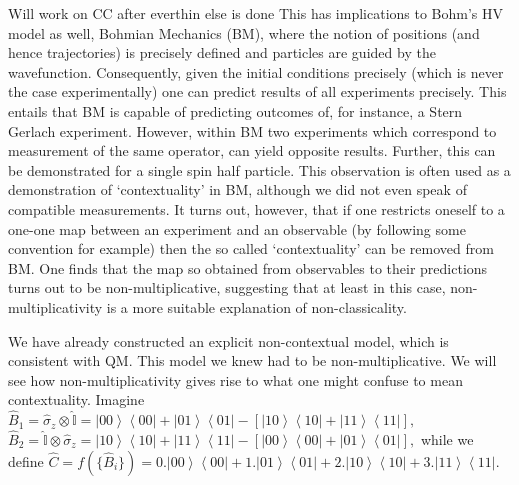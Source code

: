 \documentclass[british,aps,prl,superscriptaddress,nofootinbib,times,reprint]{revtex4-1}
\theoremstyle{plain}
\theoremstyle{definition}
\theoremstyle{remark}
\theoremstyle{remark}
\theoremstyle{remark}
\theoremstyle{plain}
\theoremstyle{plain}
\theoremstyle{plain}
\theoremstyle{definition}
\theoremstyle{definition}
\begin{document}
{\color{red} Will work on CC after everthin else
is done}
This has implications to Bohm's HV model as well, Bohmian Mechanics (BM), where the notion of positions (and hence trajectories) is precisely defined and particles are guided by the wavefunction. Consequently, given the initial conditions precisely (which is never the case experimentally) one can predict results of all experiments precisely. This entails that BM is capable of predicting outcomes of, for instance, a Stern Gerlach experiment. However, within BM two experiments which correspond to measurement of the same operator, can yield opposite results. Further, this can be demonstrated for a single spin half particle. This observation is often used as a demonstration of `contextuality' in BM, although we did not even speak of compatible measurements. It turns out, however, that if one restricts oneself to a one-one map between an experiment and an observable (by following some convention for example) then the so called `contextuality' can be removed from BM. One finds that the map so obtained from observables to their predictions turns out to be non-multiplicative, suggesting that at least in this case, non-multiplicativity is a more suitable explanation of non-classicality.

We have already constructed an explicit non-contextual model,
which is consistent with QM.  This model we knew
had to be non-multiplicative.  We will see how
non-multiplicativity gives rise to what one might
confuse to mean contextuality.  Imagine $\hat{B}_{1}=\hat{\sigma}_{z}\otimes\hat{\mathbb{I}}=\left|00\right\rangle
\left\langle 00\right|+\left|01\right\rangle
\left\langle 01\right|-\left[\left|10\right\rangle
\left\langle 10\right|+\left|11\right\rangle
\left\langle 11\right|\right],$ $
\hat{B}_{2}=\hat{\mathbb{I}}\otimes\hat{\sigma}_{z}=\left|10\right\rangle
\left\langle 10\right|+\left|11\right\rangle
\left\langle 11\right|-\left[\left|00\right\rangle
\left\langle 00\right|+\left|01\right\rangle
\left\langle 01\right|\right],$ while we define
$ \hat{C}=f(\{\hat{B}_{i}\})
=0.\left|00\right\rangle \left\langle
00\right|+1.\left|01\right\rangle \left\langle
01\right|+2.\left|10\right\rangle \left\langle
10\right|+3.\left|11\right\rangle \left\langle
11\right|. $
\end{document}
